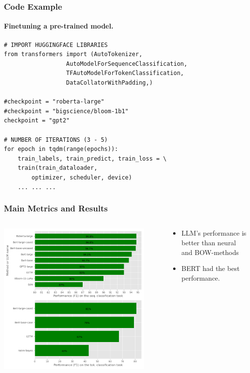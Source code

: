 \documentclass[10pt]{beamer}
\begin{document}
\begin{frame}[containsverbatim]
    \frametitle{Code Example}
    \framesubtitle{Finetuning a pre-trained model.}
    \begin{verbatim}
# IMPORT HUGGINGFACE LIBRARIES
from transformers import (AutoTokenizer,
                  AutoModelForSequenceClassification,
                  TFAutoModelForTokenClassification,
                  DataCollatorWithPadding,)

#checkpoint = "roberta-large"
#checkpoint = "bigscience/bloom-1b1"
checkpoint = "gpt2"

# NUMBER OF ITERATIONS (3 - 5)
for epoch in tqdm(range(epochs)):
    train_labels, train_predict, train_loss = \
    train(train_dataloader,
        optimizer, scheduler, device)
    ... ... ...
    \end{verbatim}
\end{frame}

\begin{frame}
    \frametitle{Main Metrics and Results}
    \begin{columns}
        \begin{column}{0.7\textwidth}
            \begin{center}
                \includegraphics[width=0.9\textwidth]{../Images/taskbars.png}
            \end{center}
        \end{column}
        \begin{column}{0.3\textwidth}
            \begin{itemize}
                \item LLM's performance is better than neural and BOW-methods
                    \pause
                \item BERT had the best performance.
            \end{itemize}
        \end{column}
    \end{columns}
\end{frame}
\end{document}
